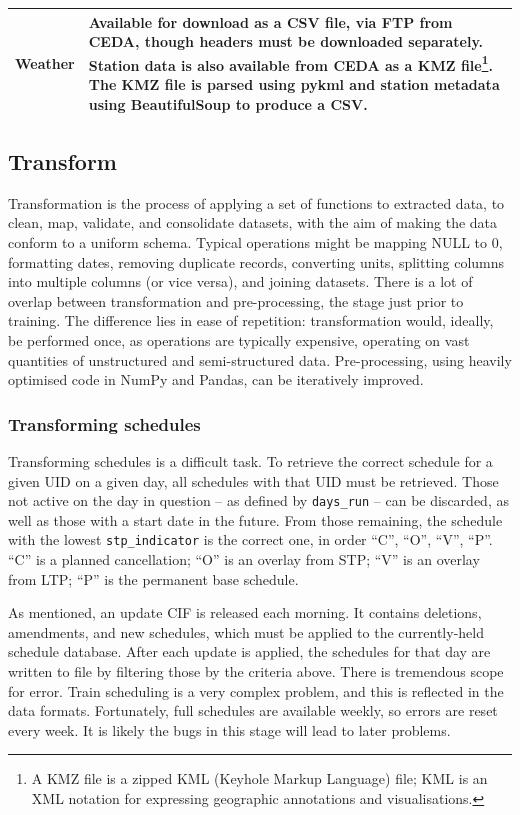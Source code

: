 \documentclass[12pt,a4paper]{article}
\begin{document}
\begin{table}[htb]
\begin{tabular}{|l|p{12cm}|}
Weather             & Available for download as a CSV file, via FTP from CEDA, though headers must be downloaded separately. Station data is also available from CEDA as a KMZ file\footnote{A KMZ file is a zipped KML (Keyhole Markup Language) file; KML is an XML notation for expressing geographic annotations and visualisations.}. The KMZ file is parsed using pykml and station metadata using BeautifulSoup to produce a CSV. \\ \hline
\end{tabular}
\end{table}

\subsection{Transform}

Transformation is the process of applying a set of functions to extracted data, to clean, map, validate, and consolidate datasets, with the aim of making the data conform to a uniform schema. Typical operations might be mapping NULL to 0, formatting dates, removing duplicate records, converting units, splitting columns into multiple columns (or vice versa), and joining datasets. There is a lot of overlap between transformation and pre-processing, the stage just prior to training. The difference lies in ease of repetition: transformation would, ideally, be performed once, as operations are typically expensive, operating on vast quantities of unstructured and semi-structured data. Pre-processing, using heavily optimised code in NumPy and Pandas, can be iteratively improved.

\subsubsection{Transforming schedules}

Transforming schedules is a difficult task. To retrieve the correct schedule for a given UID on a given day, all schedules with that UID must be retrieved. Those not active on the day in question – as defined by \verb|days_run| – can be discarded, as well as those with a start date in the future. From those remaining, the schedule with the lowest \verb|stp_indicator| is the correct one, in order “C”, “O”, “V”, “P”. “C” is a planned cancellation; “O” is an overlay from STP; “V” is an overlay from LTP; “P” is the permanent base schedule.

As mentioned, an update CIF is released each morning. It contains deletions, amendments, and new schedules, which must be applied to the currently-held schedule database. After each update is applied, the schedules for that day are written to file by filtering those by the criteria above. There is tremendous scope for error. Train scheduling is a very complex problem, and this is reflected in the data formats. Fortunately, full schedules are available weekly, so errors are reset every week. It is likely the bugs in this stage will lead to later problems. 
\end{document}

